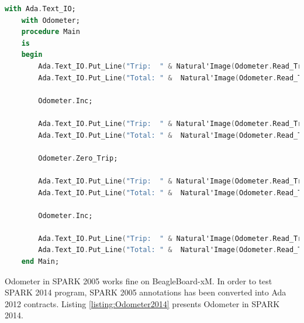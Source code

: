 \singlespacing
\begin{lstlisting}[language=ada, frame=single, gobble=0, caption={Main procedure for \lstinline{Odometer} package}]
	with Ada.Text_IO;
	with Odometer;
	procedure Main
	is
	begin
	    Ada.Text_IO.Put_Line("Trip:  " & Natural'Image(Odometer.Read_Trip));
	    Ada.Text_IO.Put_Line("Total: " &  Natural'Image(Odometer.Read_Total));

	    Odometer.Inc;

	    Ada.Text_IO.Put_Line("Trip:  " & Natural'Image(Odometer.Read_Trip));
	    Ada.Text_IO.Put_Line("Total: " &  Natural'Image(Odometer.Read_Total));

	    Odometer.Zero_Trip;

	    Ada.Text_IO.Put_Line("Trip:  " & Natural'Image(Odometer.Read_Trip));
	    Ada.Text_IO.Put_Line("Total: " &  Natural'Image(Odometer.Read_Total));

	    Odometer.Inc;

	    Ada.Text_IO.Put_Line("Trip:  " & Natural'Image(Odometer.Read_Trip));
	    Ada.Text_IO.Put_Line("Total: " &  Natural'Image(Odometer.Read_Total));
	end Main;
\end{lstlisting} 
\label{listing:main}
\doublespacing

Odometer in SPARK 2005 works fine on BeagleBoard-xM. In order to test SPARK 2014 program, SPARK 2005 annotations has been converted into Ada 2012 contracts. Listing \ref{listing:Odometer2014} presents Odometer in SPARK 2014.

